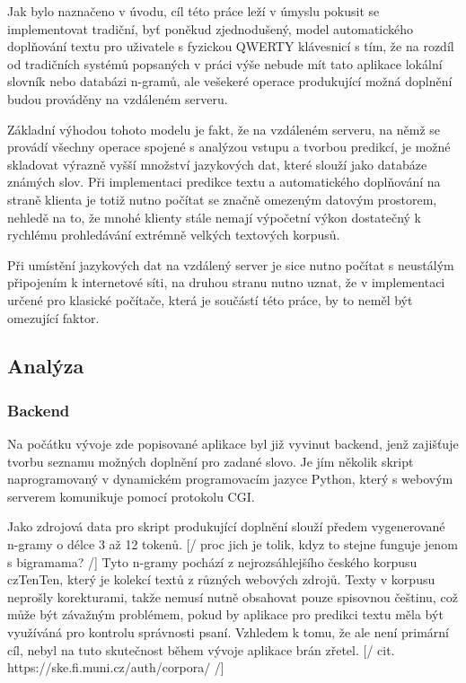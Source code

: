 \documentclass{article}
\begin{document}
Jak bylo naznačeno v úvodu, cíl této práce leží v úmyslu pokusit se implementovat tradiční, byť poněkud zjednodušený, model automatického doplňování textu pro uživatele s fyzickou QWERTY klávesnicí s tím, že na rozdíl od tradičních systémů popsaných v práci výše nebude mít tato aplikace lokální slovník nebo databázi n-gramů, ale vešekeré operace produkující možná doplnění budou prováděny na vzdáleném serveru.

Základní výhodou tohoto modelu je fakt, že na vzdáleném serveru, na němž se provádí všechny operace spojené s analýzou vstupu a tvorbou predikcí, je možné skladovat výrazně vyšší množství jazykových dat, které slouží jako databáze známých slov. Při implementaci predikce textu a automatického doplňování na straně klienta je totiž nutno počítat se značně omezeným datovým prostorem, nehledě na to, že mnohé klienty stále nemají výpočetní výkon dostatečný k rychlému prohledávání extrémně velkých textových korpusů.

Při umístění jazykových dat na vzdálený server je sice nutno počítat s neustálým připojením k internetové síti, na druhou stranu nutno uznat, že v implementaci určené pro klasické počítače, která je součástí této práce, by to neměl být omezující faktor. 

\subsection{Analýza}

\subsubsection{Backend}

Na počátku vývoje zde popisované aplikace byl již vyvinut backend, jenž zajišťuje tvorbu seznamu možných doplnění pro zadané slovo. Je jím několik skript naprogramovaný v dynamickém programovacím jazyce Python, který s webovým serverem komunikuje pomocí protokolu CGI. 

Jako zdrojová data pro skript produkující doplnění slouží předem vygenerované n-gramy o délce 3 až 12 tokenů. [/ proc jich je tolik, kdyz to stejne funguje jenom s bigramama? /] Tyto n-gramy pochází z nejrozsáhlejšího českého korpusu czTenTen, který je kolekcí textů z různých webových zdrojů. Texty v korpusu neprošly korekturami, takže nemusí nutně obsahovat pouze spisovnou češtinu, což může být závažným problémem, pokud by aplikace pro predikci textu měla být využíváná pro kontrolu správnosti psaní. Vzhledem k tomu, že ale není primární cíl, nebyl na tuto skutečnost během vývoje aplikace brán zřetel. [/ cit. https://ske.fi.muni.cz/auth/corpora/ /]
\end{document}
